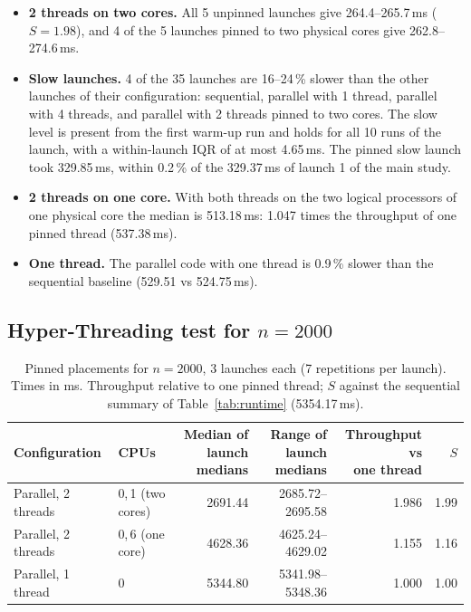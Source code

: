 \documentclass[11pt,a4paper]{article}
\begin{document}
\begin{itemize}
  \item \textbf{2 threads on two cores.} All 5 unpinned launches give 264.4--265.7\,ms ($S = 1.98$), and 4 of the 5 launches pinned to two physical cores give 262.8--274.6\,ms.
  \item \textbf{Slow launches.} 4 of the 35 launches are 16--24\,\% slower than the other launches of their configuration: sequential, parallel with 1 thread, parallel with 4 threads, and parallel with 2 threads pinned to two cores. The slow level is present from the first warm-up run and holds for all 10 runs of the launch, with a within-launch IQR of at most 4.65\,ms. The pinned slow launch took 329.85\,ms, within 0.2\,\% of the 329.37\,ms of launch 1 of the main study.
  \item \textbf{2 threads on one core.} With both threads on the two logical processors of one physical core the median is 513.18\,ms: 1.047 times the throughput of one pinned thread (537.38\,ms).
  \item \textbf{One thread.} The parallel code with one thread is 0.9\,\% slower than the sequential baseline (529.51 vs 524.75\,ms).
\end{itemize}

\subsection{Hyper-Threading test for $n = 2000$}\label{sec:ht2000}

\begin{table}[H]
\centering\small
\caption{Pinned placements for $n = 2000$, 3 launches each (7 repetitions per launch). Times in ms. Throughput relative to one pinned thread; $S$ against the sequential summary of Table~\ref{tab:runtime} (5354.17\,ms).}\label{tab:ht}
\begin{tabular}{@{}llrrrr@{}}
\toprule
Configuration & CPUs & \shortstack{Median of\\launch medians} & \shortstack{Range of\\launch medians} & \shortstack{Throughput vs\\one thread} & $S$ \\
\midrule
Parallel, 2 threads & 0,\,1 (two cores) & 2691.44 & 2685.72--2695.58 & 1.986 & 1.99 \\
Parallel, 2 threads & 0,\,6 (one core) & 4628.36 & 4625.24--4629.02 & 1.155 & 1.16 \\
Parallel, 1 thread & 0 & 5344.80 & 5341.98--5348.36 & 1.000 & 1.00 \\
\bottomrule
\end{tabular}
\end{table}
\end{document}
